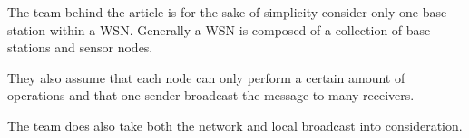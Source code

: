 \tiny

The team behind the article is for the sake of simplicity consider only one base station within a WSN. Generally a WSN is composed of a collection of base stations and sensor nodes.

\bigskip

They also assume that each node can only perform a certain amount of operations and that one sender broadcast the message to many receivers.

\bigskip

The team does also take both the network and local broadcast into consideration.